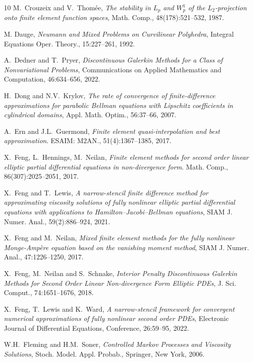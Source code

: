 \documentclass[12pt]{amsart}
\theoremstyle{definition}
\theoremstyle{remark}
\begin{document}
\begin{thebibliography}{10}
{\sc M.~Crouzeix and V.~Thom{\'{e}}e}, {\em The stability in $L_{p}$ and $W_{p}^{1}$ of 
the $L_{2}$-projection onto finite element function spaces}, 
Math. Comp., 48(178):521--532, 1987.

{\sc M. Dauge}, {\em Neumann and Mixed Problems on Curvilinear Polyhedra}, 
Integral Equations Oper. Theory., 15:227--261, 1992.

{\sc A.~Dedner and T.~Pryer}, {\em Discontinuous Galerkin Methods for a Class of 
Nonvariational Problems}, Communications on Applied Mathematics and Computation, 
46:634--656, 2022.

{\sc H.~Dong and N.V.~Krylov}, {\em The rate of convergence of finite-difference 
approximations for parabolic Bellman equations with Lipschitz coefficients in cylindrical domains}, 
Appl. Math. Optim., 56:37--66, 2007. 
  
{\sc A.~Ern and J.L.~Guermond}, {\em Finite element quasi-interpolation and best approximation}. 
ESAIM: M2AN., 51(4):1367--1385, 2017.

{\sc X.~Feng, L.~Hennings, M.~Neilan}, {\em Finite element methods for second order linear elliptic 
partial differential equations in non-divergence form}. Math. Comp., 86(307):2025--2051, 2017.  

{\sc X.~Feng and T.~Lewis}, {\em A narrow-stencil finite difference method for 
approximating viscosity solutions of fully nonlinear elliptic partial 
differential equations with applications to Hamilton–Jacobi–Bellman
equations}, SIAM J. Numer. Anal., 59(2):886--924, 2021.

{\sc X.~Feng and M.~Neilan}, {\em  Mixed finite element methods for the fully 
nonlinear Monge-Amp\`{e}re equation based on the vanishing moment method}, 
SIAM J. Numer. Anal., 47:1226--1250, 2017.

{\sc X.~Feng, M.~Neilan and S.~Schnake}, {\em Interior Penalty Discontinuous Galerkin 
Methods for Second Order Linear Non-divergence Form Elliptic PDEs}, 
J. Sci. Comput., 74:1651--1676, 2018.

{\sc X.~Feng, T.~Lewis and K.~Ward}, {\em A narrow-stencil framework for convergent 
numerical approximations of fully nonlinear second order PDEs}, 
Electronic Journal of Differential Equations, Conference, 26:59--95, 2022.

{\sc W.H.~Fleming and H.M.~Soner}, {\em Controlled Markov Processes and 
Viscosity Solutions}, Stoch. Model. Appl. Probab., Springer, New York, 2006.


\end{thebibliography}
\end{document}
